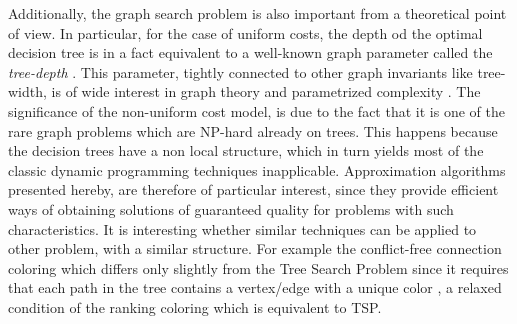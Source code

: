 Additionally, the graph search problem is also important from a theoretical point of view. In particular, for the case of uniform costs, the depth od the optimal decision tree is in a fact equivalent to a well-known graph parameter called the \emph{tree-depth} \cite{GIANNOPOULOU20122089}. This parameter, tightly connected to other graph invariants like tree-width, is of wide interest in graph theory and parametrized complexity \cite{BODLAENDER1995238,NESETRIL20061022, BOROWIECKI2023113682}. The significance of the non-uniform cost model, is due to the fact that it is one of the rare graph problems which are NP-hard already on trees. This happens because the decision trees have a non local structure, which in turn yields most of the classic dynamic programming techniques inapplicable. Approximation algorithms presented hereby, are therefore of particular interest, since they provide efficient ways of obtaining solutions of guaranteed quality for problems with such characteristics. It is interesting whether similar techniques can be applied to other problem, with a similar structure. For example the conflict-free connection coloring which differs only slightly from the Tree Search Problem since it requires that each path in the tree contains a vertex/edge with a unique color \cite{CfreeConOfTs}, a relaxed condition of the ranking coloring which is equivalent to TSP. 

